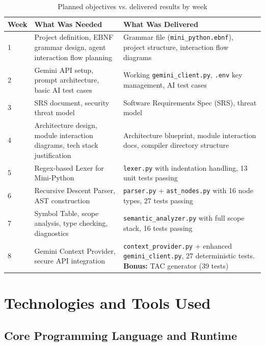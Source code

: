 \documentclass[a4paper,11pt]{article}
\begin{document}
\begin{table}[h!]
\centering
\begin{tabularx}{\textwidth}{|l|X|X|}
\hline
\rowcolor{blue!10}
\textbf{Week} & \textbf{What Was Needed} & \textbf{What Was Delivered} \\
\hline
1 & Project definition, EBNF grammar design, agent interaction flow planning & Grammar file (\texttt{mini\_python.ebnf}), project structure, interaction flow diagrams \\
\hline
2 & Gemini API setup, prompt architecture, basic AI test cases & Working \texttt{gemini\_client.py}, \texttt{.env} key management, AI test cases \\
\hline
3 & SRS document, security threat model & Software Requirements Spec (SRS), threat model \\
\hline
4 & Architecture design, module interaction diagrams, tech stack justification & Architecture blueprint, module interaction docs, compiler directory structure \\
\hline
5 & Regex-based Lexer for Mini-Python & \texttt{lexer.py} with indentation handling, 13 unit tests passing \\
\hline
6 & Recursive Descent Parser, AST construction & \texttt{parser.py} + \texttt{ast\_nodes.py} with 16 node types, 27 tests passing \\
\hline
7 & Symbol Table, scope analysis, type checking, diagnostics & \texttt{semantic\_analyzer.py} with full scope stack, 16 tests passing \\
\hline
8 & Gemini Context Provider, secure API integration & \texttt{context\_provider.py} + enhanced \texttt{gemini\_client.py}, 27 deterministic tests. \textbf{Bonus:} TAC generator (39 tests) \\
\hline
\end{tabularx}
\caption{Planned objectives vs. delivered results by week}
\end{table}


\section{Technologies and Tools Used}

\subsection{Core Programming Language and Runtime}
\end{document}
